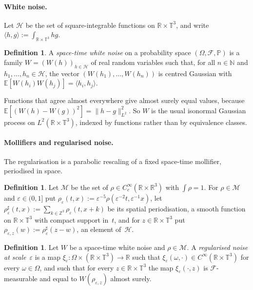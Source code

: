\documentclass[11pt,letterpaper]{article}
\numberwithin{equation}{section}
\theoremstyle{plain}
\theoremstyle{definition}
\newtheorem{definition}[proposition]{Definition}
\theoremstyle{remark}
\newcommand{\R}{\mathbb{R}}
\newcommand{\Z}{\mathbb{Z}}
\newcommand{\N}{\mathbb{N}}
\newcommand{\T}{\mathbb{T}^3}
\newcommand{\E}{\mathbb{E}}
\newcommand{\Prob}{\mathbb{P}}
\newcommand{\Hil}{\mathcal{H}}
\newcommand{\Mol}{\mathcal{M}}
\newcommand{\1}{\mathbf{1}}
\begin{document}
\paragraph{White noise.} Let $\Hil$ be the set of square-integrable functions on $\R\times\T$, and write $\langle h,g\rangle:=\int_{\R\times\T}hg$.

\begin{definition}
\label{d.noise}
A \emph{space-time white noise} on a probability space $(\Omega,\mathcal{F},\Prob)$ is a family $W=(W(h))_{h\in\Hil}$ of real random variables such that, for all $n\in\N$ and $h_1,\dots,h_n\in\Hil$, the vector $(W(h_1),\dots,W(h_n))$ is centred Gaussian with $\E[W(h_i)W(h_j)]=\langle h_i,h_j\rangle$.
\end{definition}

Functions that agree almost everywhere give almost surely equal values, because $\E[(W(h)-W(g))^2]=\|h-g\|_{L^2}^2$. So $W$ is the usual isonormal Gaussian process on $L^2(\R\times\T)$, indexed by functions rather than by equivalence classes.

\paragraph{Mollifiers and regularised noise.} The regularisation is a parabolic rescaling of a fixed space-time mollifier, periodised in space.

\begin{definition}
\label{d.mollifier}
Let $\Mol$ be the set of $\rho\in C_c^\infty(\R\times\R^3)$ with $\int\rho=1$. For $\rho\in\Mol$ and $\varepsilon\in(0,1]$ put $\rho_\varepsilon(t,x):=\varepsilon^{-5}\rho(\varepsilon^{-2}t,\varepsilon^{-1}x)$, let $\rho_\varepsilon^\sharp(t,x):=\sum_{k\in\Z^3}\rho_\varepsilon(t,x+k)$ be its spatial periodisation, a smooth function on $\R\times\T$ with compact support in~$t$, and for $z\in\R\times\T$ put $\rho_{\varepsilon,z}(w):=\rho_\varepsilon^\sharp(z-w)$, an element of~$\Hil$.
\end{definition}

\begin{definition}
\label{d.regnoise}
Let $W$ be a space-time white noise and $\rho\in\Mol$. A \emph{regularised noise at scale~$\varepsilon$} is a map $\xi_\varepsilon\colon\Omega\times(\R\times\T)\to\R$ such that $\xi_\varepsilon(\omega,\cdot)\in C^\infty(\R\times\T)$ for every $\omega\in\Omega$, and such that for every $z\in\R\times\T$ the map $\xi_\varepsilon(\cdot,z)$ is $\mathcal{F}$-measurable and equal to $W(\rho_{\varepsilon,z})$ almost surely.
\end{definition}
\end{document}
